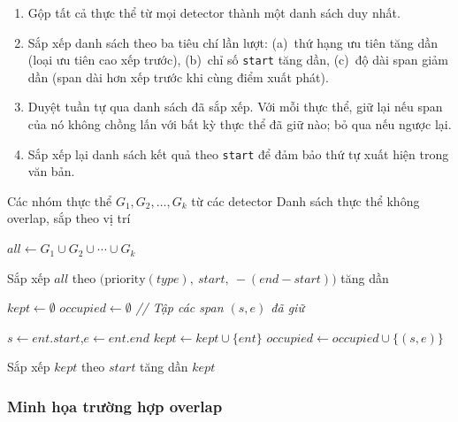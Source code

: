 \begin{enumerate}[nosep]
    \item Gộp tất cả thực thể từ mọi detector thành một danh sách duy nhất.
    \item Sắp xếp danh sách theo ba tiêu chí lần lượt: (a)~thứ hạng ưu tiên
          tăng dần (loại ưu tiên cao xếp trước), (b)~chỉ số \texttt{start}
          tăng dần, (c)~độ dài span giảm dần (span dài hơn xếp trước khi cùng
          điểm xuất phát).
    \item Duyệt tuần tự qua danh sách đã sắp xếp. Với mỗi thực thể, giữ lại
          nếu span của nó không chồng lấn với bất kỳ thực thể đã giữ nào;
          bỏ qua nếu ngược lại.
    \item Sắp xếp lại danh sách kết quả theo \texttt{start} để đảm bảo thứ tự
          xuất hiện trong văn bản.
\end{enumerate}

\begin{algorithm}[H]
    \caption{Thuật toán hợp nhất và giải quyết overlap (Greedy Priority-First)}
    \label{alg:merger}
    \begin{algorithmic}[1]
        \Require Các nhóm thực thể $G_1, G_2, \ldots, G_k$ từ các detector
        \Ensure Danh sách thực thể không overlap, sắp theo vị trí

        \State $all \leftarrow G_1 \cup G_2 \cup \cdots \cup G_k$

        \State Sắp xếp $all$ theo $\bigl(\text{priority}(type),\ start,\ -(end - start)\bigr)$ tăng dần

        \State $kept \leftarrow \emptyset$
        \State $occupied \leftarrow \emptyset$ \quad \textit{// Tập các span $(s, e)$ đã giữ}

        \State $s \leftarrow ent.start$,\quad $e \leftarrow ent.end$
        \State $kept \leftarrow kept \cup \{ent\}$
        \State $occupied \leftarrow occupied \cup \{(s, e)\}$
        \EndIf
        \EndFor

        \State Sắp xếp $kept$ theo $start$ tăng dần
        \State \Return $kept$
    \end{algorithmic}
\end{algorithm}

\subsubsection{Minh họa trường hợp overlap}

